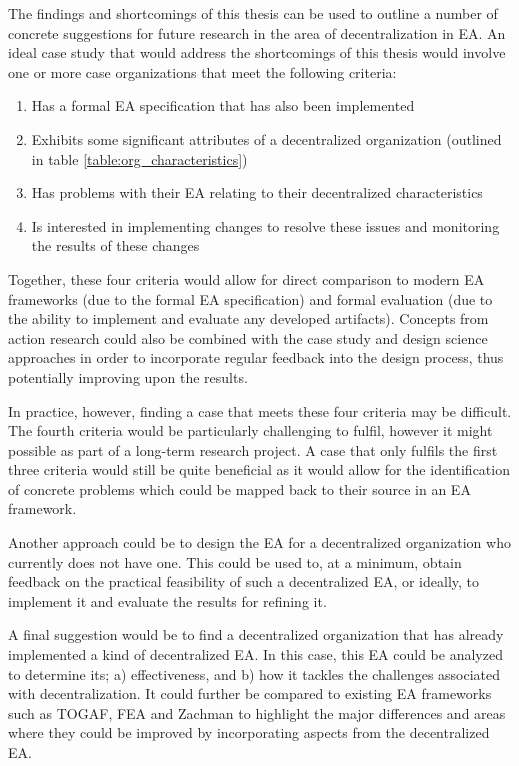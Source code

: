 The findings and shortcomings of this thesis can be used to outline a number of concrete suggestions for future research in the area of decentralization in EA. An ideal case study that would address the shortcomings of this thesis would involve one or more case organizations that meet the following criteria:

\begin{enumerate}
\item Has a formal EA specification that has also been implemented
\item Exhibits some significant attributes of a decentralized organization (outlined in table \ref{table:org_characteristics})
\item Has problems with their EA relating to their decentralized characteristics
\item Is interested in implementing changes to resolve these issues and monitoring the results of these changes
\end{enumerate}

Together, these four criteria would allow for direct comparison to modern EA frameworks (due to the formal EA specification) and formal evaluation (due to the ability to implement and evaluate any developed artifacts). Concepts from action research could also be combined with the case study and design science approaches in order to incorporate regular feedback into the design process, thus potentially improving upon the results. 

In practice, however, finding a case that meets these four criteria may be difficult. The fourth criteria would be particularly challenging to fulfil, however it might possible as part of a long-term research project. A case that only fulfils the first three criteria would still be quite beneficial as it would allow for the identification of concrete problems which could be mapped back to their source in an EA framework. 

Another approach could be to design the EA for a decentralized organization who currently does not have one. This could be used to, at a minimum, obtain feedback on the practical feasibility of such a decentralized EA, or ideally, to implement it and evaluate the results for refining it. 

A final suggestion would be to find a decentralized organization that has already implemented a kind of decentralized EA. In this case, this EA could be analyzed to determine its; a) effectiveness, and b) how it tackles the challenges associated with decentralization. It could further be compared to existing EA frameworks such as TOGAF, FEA and Zachman to highlight the major differences and areas where they could be improved by incorporating aspects from the decentralized EA. 